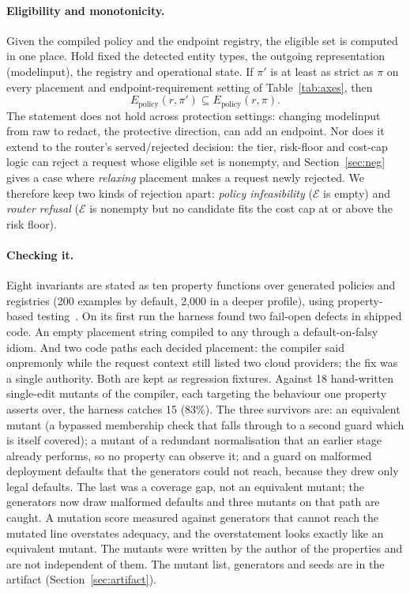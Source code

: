 \documentclass[11pt]{article}
\newcommand{\ubreak}{\textunderscore\allowbreak}
\newcommand{\code}[1]{{\ttfamily\let\_\ubreak #1}}
\newcommand{\E}{\mathcal{E}}
\begin{document}
\paragraph{Eligibility and monotonicity.} Given the compiled policy and the endpoint registry,
the eligible set is computed in one place. Hold fixed the detected entity types, the outgoing
representation (\code{model\_input}), the registry and operational state. If $\pi'$ is at least
as strict as $\pi$ on every placement and endpoint-requirement setting of Table~\ref{tab:axes},
then
\[
  E_{\mathrm{policy}}(r, \pi') \subseteq E_{\mathrm{policy}}(r, \pi).
\]
The statement does not hold across protection settings: changing \code{model\_input} from
\code{raw} to \code{redact}, the protective direction, can add an endpoint. Nor does it extend to
the router's served/rejected decision: the tier, risk-floor and cost-cap logic can reject a
request whose eligible set is nonempty, and Section~\ref{sec:neg}
gives a case where \emph{relaxing} placement makes a request newly rejected. We therefore keep
two kinds of rejection apart: \emph{policy infeasibility} ($\E$ is empty) and \emph{router
refusal} ($\E$ is nonempty but no candidate fits the cost cap at or above the risk floor).

\paragraph{Checking it.} Eight invariants are stated as ten property functions over generated
policies and registries (200 examples by default, 2{,}000 in a deeper profile), using
property-based testing~\cite{quickcheck,hypothesis}. On its first run the harness found two
fail-open defects in shipped code. An empty placement string compiled to \code{any} through a
default-on-falsy idiom. And two code paths each decided placement: the compiler said
\code{onprem\_only} while the request context still listed two cloud providers; the fix was a
single authority. Both are kept as regression fixtures. Against 18 hand-written single-edit
mutants of the compiler, each targeting the behaviour one property asserts over, the harness
catches 15 (83\%). The three survivors are: an equivalent mutant (a bypassed membership check
that falls through to a second guard which is itself covered); a mutant of a redundant
normalisation that an earlier stage already performs, so no property can observe it; and a
guard on malformed deployment defaults that the generators could not reach, because they drew
only legal defaults. The last was a coverage gap, not an equivalent mutant; the generators now
draw malformed defaults and three mutants on that path are caught. A mutation score measured
against generators that cannot reach the mutated line overstates adequacy, and the overstatement
looks exactly like an equivalent mutant. The mutants were written by the author of the
properties and are not independent of them. The mutant list, generators and seeds are in the
artifact (Section~\ref{sec:artifact}).
\end{document}
